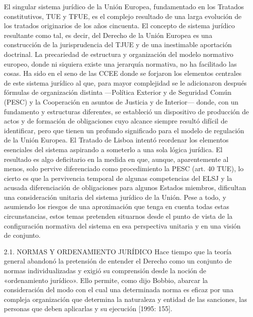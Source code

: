 \documentclass[10pt,a4paper]{article}
\begin{document}
El singular sistema jurídico de la Unión Europea, fundamentado en los Tratados constitutivos, TUE y TFUE, es el complejo resultado de una larga evolución de los tratados originarios de los años cincuenta. El concepto de sistema jurídico resultante como tal, es decir, del Derecho de la Unión Europea es una construcción de la jurisprudencia del TJUE y de una inestimable aportación doctrinal. La precariedad de estructura y organización del modelo normativo europeo, donde ni siquiera existe una jerarquía normativa, no ha facilitado las cosas. Ha sido en el seno de las CCEE donde se forjaron los elementos centrales de este sistema jurídico al que, para mayor complejidad se le adicionaron después fórmulas de organización distinta —Política Exterior y de Seguridad Común (PESC) y la Cooperación en asuntos de Justicia y de Interior— donde, con un fundamento y estructuras diferentes, se estableció un dispositivo de producción de actos y de formación de obligaciones cuyo alcance siempre resultó difícil de identificar, pero que tienen un profundo significado para el modelo de regulación de la Unión Europea. El Tratado de Lisboa intentó reordenar los elementos esenciales del sistema aspirando a someterlo a una sola lógica jurídica. El resultado es algo deficitario en la medida en que, aunque, aparentemente al menos, solo pervive diferenciado como procedimiento la PESC (art. 40 TUE), lo cierto es que la pervivencia temporal de algunas competencias del ELSJ y la acusada diferenciación de obligaciones para algunos Estados miembros, dificultan una consideración unitaria del sistema jurídico de la Unión. Pese a todo, y asumiendo los riesgos de una aproximación que tenga en cuenta todas estas circunstancias, estos temas pretenden situarnos desde el punto de vista de la configuración normativa del sistema en esa perspectiva unitaria y en una visión de conjunto.




2.1. NORMAS Y ORDENAMIENTO JURÍDICO
Hace tiempo que la teoría general abandonó la pretensión de entender el Derecho como un conjunto de normas individualizadas y exigió su comprensión desde la noción de «ordenamiento jurídico». Ello permite, como dijo Bobbio, abarcar la consideración del modo con el cual una determinada norma es eficaz por una compleja organización que determina la naturaleza y entidad de las sanciones, las personas que deben aplicarlas y su ejecución [1995: 155]. 
\end{document}
